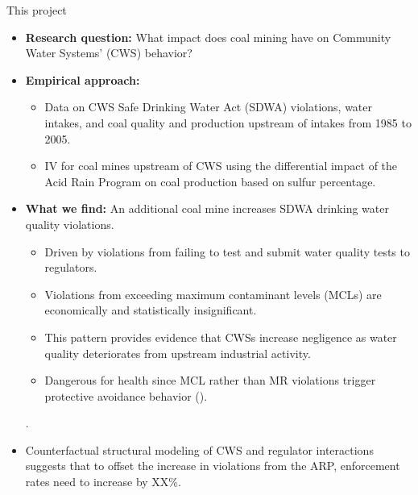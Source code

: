 \documentclass{beamer}
\begin{document}
\begin{frame}{This project}
    \begin{itemize}
        \item \textbf{Research question:} What impact does coal mining have on Community Water Systems' (CWS) behavior?
        \item \textbf{Empirical approach:} 
        \begin{itemize}
            \item Data on CWS Safe Drinking Water Act (SDWA) violations, water intakes, and coal quality and production upstream of intakes from 1985 to 2005.
            \item IV for coal mines upstream of CWS using the differential impact of the Acid Rain Program on coal production based on sulfur percentage.
        \end{itemize}
            \item \textbf{What we find:} An additional coal mine increases SDWA drinking water quality violations.
        \begin{itemize}
            \item Driven by violations from failing to test and submit water quality tests to regulators.
            \item Violations from exceeding maximum contaminant levels (MCLs) are economically and statistically insignificant.
            \item This pattern provides evidence that CWSs increase negligence as water quality deteriorates from upstream industrial activity.
            \item Dangerous for health since MCL rather than MR violations trigger protective avoidance behavior (\cite{zivin2011water}).
        \end{itemize}.
        \item Counterfactual structural modeling of CWS and regulator interactions suggests that to offset the increase in violations from the ARP, enforcement rates need to increase by XX\%. 
    \end{itemize}
\end{frame}
\end{document}
